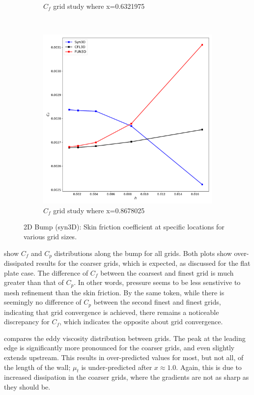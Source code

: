 \begin{figure}[ht!]
\begin{subfigure}{.45\textwidth}
  \caption{$C_f$ grid study where x=0.6321975}
\end{subfigure}
\\
\begin{subfigure}{.45\textwidth}
  \centering
  \includegraphics[width=1.0\textwidth]{figs/2dbump/Cf08678025GridStudy.pdf}
  \caption{$C_f$ grid study where x=0.8678025}
\end{subfigure}%
\caption{2D Bump (syn3D): Skin friction coefficient at specific locations for various grid sizes.}
\label{fig:syn2dbumpcflocstudy}
\end{figure}

 show $C_f$ and $C_p$ distributions along the bump for all grids. Both plots show over-dissipated results for the coarser grids, which is expected, as discussed for the flat plate case. The difference of $C_f$ between the coarsest and finest grid is much greater than that of $C_p$. In other words, pressure seems to be less senstivive to mesh refinement than the skin friction. By the same token, while there is seemingly no difference of $C_p$ between the second finest and finest grids, indicating that grid convergence is achieved, there remains a noticeable discrepancy for $C_f$, which indicates the opposite about grid convergence.

 compares the eddy viscosity distribution between grids. The peak at the leading edge is significantly more pronounced for the coarser grids, and even slightly extends upstream. This results in over-predicted values for most, but not all, of the length of the wall; $\mu_t$ is under-predicted after $x\approx1.0$. Again, this is due to increased dissipation in the coarser grids, where the gradients are not as sharp as they should be.

